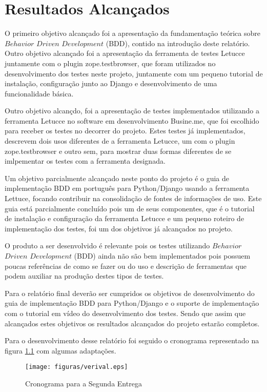\chapter[Resultados Alcançados]{Resultados Alcançados}

O primeiro objetivo alcançado foi a apresentação da fundamentação teórica sobre $Behavior$ $Driven$ $Development$ (BDD), contido na introdução deste relatório. Outro objetivo alcançado foi a apresentação da ferramenta de testes Letucce juntamente com o plugin zope.testbrowser, que foram utilizados no desenvolvimento dos testes neste projeto, juntamente com um pequeno tutorial de instalação, configuração junto ao Django e desenvolvimento de uma funcionalidade básica.

Outro objetivo alcançdo, foi a apresentação de testes implementados utilizando a ferramenta Letucce no software em desenvolvimento Busine.me, que foi escolhido para receber os testes no decorrer do projeto. Estes testes já implementados, descrevem dois usos diferentes de a ferramenta Letucce, um com o plugin zope.testbrowser e outro sem, para mostrar duas formas diferentes de se imlpementar os testes com a ferramenta designada. 

Um objetivo parcialmente alcançado neste ponto do projeto é o guia de implementação BDD em português para Python/Django usando a ferramenta Lettuce, focando contribuir na consolidação de fontes de informações de uso. Este guia está parcialmente concluído pois um de seus componentes, que é o tutorial de instalação e configuração da ferramenta Letucce e um pequeno roteiro de implementação dos testes, foi um dos objetivos já alcançados no projeto.

O produto a ser desenvolvido é relevante pois os testes utilizando $Behavior$ $Driven$ $Development$ (BDD) ainda não são bem implementados pois possuem poucas referências de como se fazer ou do uso e descrição de ferramentas que podem auxiliar na produção destes tipos de testes.

Para o relatório final deverão ser cumpridos os objetivos de desenvolvimento do guia de implementação BDD para Python/Django e o suporte de implementação com o tutorial em vídeo do desenvolvimento dos testes. Sendo que assim que alcançados estes objetivos os resultados alcançados do projeto estarão completos.

Para o desenvolvimento desse relatório foi seguido o cronograma representado na figura \ref{fig:cronograma} com algumas adaptações.

\begin{figure}[h!]
        \centering
        \texttt{[image: figuras/verival.eps]}
        \caption{Cronograma para a Segunda Entrega}
        \label{fig:cronograma}
\end{figure}
